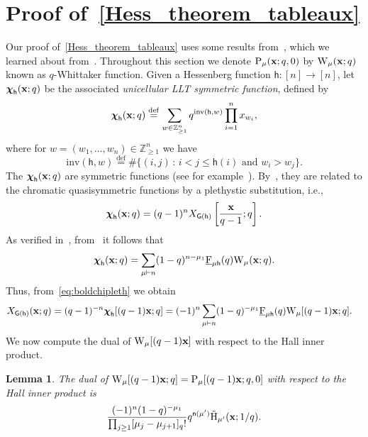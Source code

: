 \documentclass[12pt,a4paper,reqno]{amsart}
\theoremstyle{plain}
\newtheorem{lemma}[theorem]{Lemma}
\theoremstyle{definition}
\newcommand{\defin}{\overset{\mathrm{def}}{=}}
\newcommand{\ZZ}{{\mathbb{Z}}}
\newcommand{\1}{\mathds{1}}
\renewcommand{\P}{\mathrm{P}}
\newcommand{\F}{\mathrm{F}}
\newcommand{\HH}{\mathrm{H}}
\newcommand{\W}{\mathrm{W}}
\newcommand{\x}{{\bf x}}
\newcommand{\fn}{\mathsf{n}}
\newcommand{\hes}{\mathsf{h}}
\newcommand{\graph}{\mathsf{G}}
\begin{document}
\section{Proof of~\cref{Hess_theorem_tableaux}}
Our proof of~\cref{Hess_theorem_tableaux} uses some results from~\cite{CarlssonMellit}, which we learned about from~\cite{BasuBhattacharya}. Throughout this section we denote $\P_\mu(\x;q,0)$ by $\W_{\mu}(\x;q)$ known as $q$-Whittaker function. Given a Hessenberg function $\hes:[n]\to [n]$, let $\boldsymbol\chi_\hes(\x;q)$ be  the associated \emph{unicellular LLT symmetric function}, defined by
\[
\boldsymbol{\chi}_\hes(\x;q)\defin\sum_{w\in\ZZ_{\geq 1}^n}
q^{\mathrm{inv}(\hes,w)}\prod_{i=1}^nx_{w_i},
\]
where for $w=(w_1,\ldots,w_n)\in \ZZ_{\geq 1}^n$ we have
\[
\mathrm{inv}(\hes,w)\defin
\#\{(i,j)\,:\,i<j\leq \hes(i)\text{ and }w_i>w_j\}.
\]
The $\boldsymbol\chi_\hes(\x;q)$ are symmetric functions (see for example~\cite[Proposition 3.2]{CarlssonMellit}). By~\cite[Proposition 3.5]{CarlssonMellit}, they are related to
the chromatic quasisymmetric functions by a plethystic substitution, i.e., 
\begin{equation}
\label{eq:boldchipleth}
\boldsymbol\chi_\hes(\x;q)=(q-1)^nX_{\graph(\hes)}\left[\frac{\x}{q-1};q\right].
\end{equation}
As verified in~\cite[Proposition 5.1]{BasuBhattacharya}, from~\cite[Theorem 4.1]{GriffinMellitetal} it follows that
\[
\boldsymbol\chi_\hes(\x;q)=
\sum_{\mu\vdash n}
(1-q)^{n-\mu_1}\underline{\F}_{\mu \hes}(q)
\W_{\mu}(\x;q).
\] 
Thus, from~\cref{eq:boldchipleth} we obtain
\begin{align}
\label{eq:trickysign}
X_{\graph(\hes)}(\x;q)&
=(q-1)^{-n}\boldsymbol\chi_\hes[(q-1)\x;q]
=(-1)^n
\sum_{\mu\vdash n}
(1-q)^{-\mu_1}\underline{\F}_{\mu\hes}(q)
\W_{\mu}[(q-1)\x;q].
\end{align}
We now compute the dual of $\W_\mu[(q-1)\x]$ with respect to the Hall inner product.
\begin{lemma}\label{dual of whittaker} The dual of $\W_\mu[(q-1)\x;q]=\P_\mu[(q-1)\x;q,0]$ with respect to the Hall inner product is 
$$
\frac{(-1)^n(1-q)^{-\mu_1}}{\prod_{j\geq 1}[\mu_j-\mu_{j+1}]_q!}q^{\fn(\mu')}\tilde{\HH}_{\mu'}(\x;1/q).
$$
\end{lemma}
\end{document}
